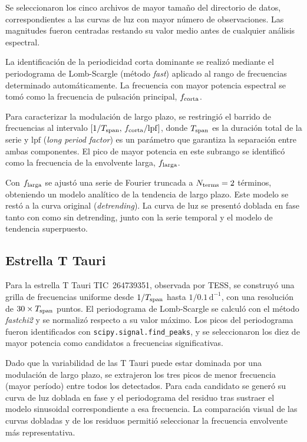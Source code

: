 \documentclass[letterpaper,12pt]{extarticle}
\begin{document}
Se seleccionaron los cinco archivos de mayor tamaño del directorio de datos, correspondientes a las curvas de luz con mayor número de observaciones. Las magnitudes fueron centradas restando su valor medio antes de cualquier análisis espectral.

La identificación de la periodicidad corta dominante se realizó mediante el periodograma de Lomb-Scargle (método \textit{fast}) aplicado al rango de frecuencias determinado automáticamente. La frecuencia con mayor potencia espectral se tomó como la frecuencia de pulsación principal, $f_{\rm corta}$.

Para caracterizar la modulación de largo plazo, se restringió el barrido de frecuencias al intervalo $[1/T_{\rm span},\, f_{\rm corta}/\mathrm{lpf}]$, donde $T_{\rm span}$ es la duración total de la serie y $\mathrm{lpf}$ (\textit{long period factor}) es un parámetro que garantiza la separación entre ambas componentes. El pico de mayor potencia en este subrango se identificó como la frecuencia de la envolvente larga, $f_{\rm larga}$.

Con $f_{\rm larga}$ se ajustó una serie de Fourier truncada a $N_{\rm terms} = 2$ términos, obteniendo un modelo analítico de la tendencia de largo plazo. Este modelo se restó a la curva original (\textit{detrending}). La curva de luz se presentó doblada en fase tanto con como sin detrending, junto con la serie temporal y el modelo de tendencia superpuesto.

\subsection{Estrella T Tauri}

Para la estrella T Tauri TIC~264739351, observada por TESS, se construyó una grilla de frecuencias uniforme desde $1/T_{\rm span}$ hasta $1/0.1\,\mathrm{d}^{-1}$, con una resolución de $30\times T_{\rm span}$ puntos. El periodograma de Lomb-Scargle se calculó con el método \textit{fastchi2} y se normalizó respecto a su valor máximo. Los picos del periodograma fueron identificados con \texttt{scipy.signal.find\_peaks}, y se seleccionaron los diez de mayor potencia como candidatos a frecuencias significativas.

Dado que la variabilidad de las T Tauri puede estar dominada por una modulación de largo plazo, se extrajeron los tres picos de menor frecuencia (mayor período) entre todos los detectados. Para cada candidato se generó su curva de luz doblada en fase y el periodograma del residuo tras sustraer el modelo sinusoidal correspondiente a esa frecuencia. La comparación visual de las curvas dobladas y de los residuos permitió seleccionar la frecuencia envolvente más representativa.
\end{document}
